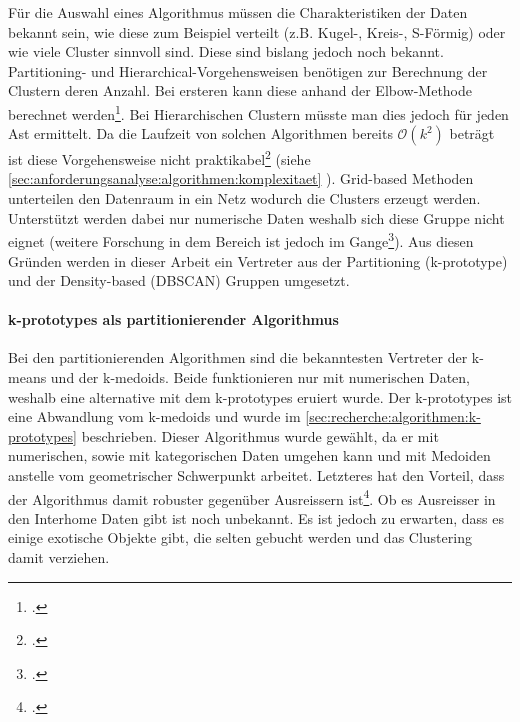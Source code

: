 Für die Auswahl eines Algorithmus müssen die Charakteristiken der Daten bekannt sein, wie diese zum Beispiel verteilt (z.B. Kugel-, Kreis-, S-Förmig) oder wie viele Cluster sinnvoll sind. Diese sind bislang jedoch noch bekannt.
Partitioning- und Hierarchical-Vorgehensweisen benötigen zur Berechnung der Clustern deren Anzahl. Bei ersteren kann diese anhand der Elbow-Methode berechnet werden\footcite{elbow_method}. Bei Hierarchischen Clustern müsste man dies jedoch für jeden Ast ermittelt. Da die Laufzeit von solchen Algorithmen bereits $\mathcal{O}(k^2)$ beträgt ist diese Vorgehensweise nicht praktikabel\footcite{complexity_hierarchical_clustering} (siehe \cref{sec:anforderungsanalyse:algorithmen:komplexitaet} ). Grid-based Methoden unterteilen den Datenraum in ein Netz wodurch die Clusters erzeugt werden. Unterstützt werden dabei nur numerische Daten weshalb sich diese Gruppe nicht eignet (weitere Forschung in dem Bereich ist jedoch im Gange\footcite{sting_categorical_data}).
Aus diesen Gründen werden in dieser Arbeit ein Vertreter aus der Partitioning (k-prototype) und der Density-based (DBSCAN) Gruppen umgesetzt.

\paragraph{k-prototypes als partitionierender Algorithmus}
\label{sec:konzept:algorithmenauswahl:clustering:kprototypes}
Bei den partitionierenden Algorithmen sind die bekanntesten Vertreter der k-means und der k-medoids. Beide funktionieren nur mit numerischen Daten, weshalb eine alternative mit dem k-prototypes eruiert wurde. Der k-prototypes ist eine Abwandlung vom k-medoids und wurde im \cref{sec:recherche:algorithmen:k-prototypes} beschrieben. Dieser Algorithmus wurde gewählt, da er mit numerischen, sowie mit kategorischen Daten umgehen kann und mit Medoiden anstelle vom geometrischer Schwerpunkt arbeitet. Letzteres hat den Vorteil, dass der Algorithmus damit robuster gegenüber Ausreissern ist\footcite{data_mining_concepts_and_techniques}. Ob es Ausreisser in den Interhome Daten gibt ist noch unbekannt. Es ist jedoch zu erwarten, dass es einige exotische Objekte gibt, die selten gebucht werden und das Clustering damit verziehen. 

